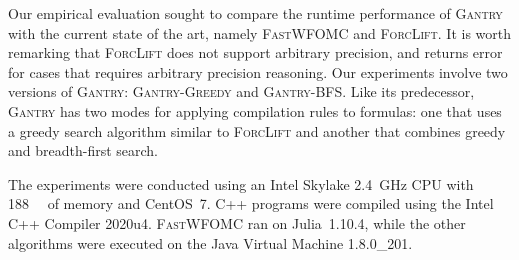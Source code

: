 \documentclass[a4paper,UKenglish,cleveref, autoref, thm-restate]{lipics-v2021}
\newcommand{\Cranetwo}{\textsc{Gantry}}
\newcommand{\Cranebfs}{\textsc{Gantry-BFS}}
\newcommand{\Cranegreedy}{\textsc{Gantry-Greedy}}
\begin{document}



Our empirical evaluation sought to compare the runtime performance of
{\Cranetwo} with the current state of the art, namely \textsc{FastWFOMC} and
\textsc{ForcLift}. It is worth remarking that \textsc{ForcLift} does not support
arbitrary precision, and returns error for cases that requires arbitrary
precision reasoning. Our experiments involve two versions of \Cranetwo{}:
\Cranegreedy{} and \Cranebfs{}. Like its predecessor, \Cranetwo{} has two modes
for applying compilation rules to formulas: one that uses a greedy search
algorithm similar to \textsc{ForcLift} and another that combines greedy and
breadth-first search.

The experiments were conducted using an Intel Skylake \SI{2.4}{\giga\hertz} CPU
with \SI{188}{\gibi\byte} of memory and CentOS~7. C++ programs were compiled
using the Intel C++ Compiler 2020u4. \textsc{FastWFOMC} ran on Julia~1.10.4,
while the other algorithms were executed on the Java Virtual Machine 1.8.0\_201.



\end{document}
